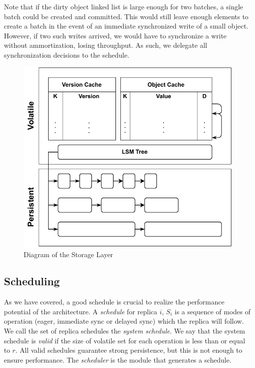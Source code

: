 Note that if the dirty object linked list is large enough
for two batches, a single batch could be created and committed.
This would still leave enough elements to create a batch in the
event of an immediate synchronized write of a small object. However, if
two such writes arrived, we would have to synchronize a write without
ammortization, losing throughput. As such, we delegate all
synchronization decisions to the schedule.


\begin{figure}[ht]
    \centering
    \includegraphics[width=.8\linewidth]{img/storage_layer}
    \caption{Diagram of the Storage Layer}\label{fig:storage_layer}
\end{figure}


\subsection{Scheduling}\label{ssec:schedule}


As we have covered, a good schedule is crucial to realize the
performance potential of the architecture. A \emph{schedule} for
replica $i$, $S_i$ is a sequence of modes of operation (eager,
immediate sync or delayed sync) which the replica will follow.
We call the set of replica schedules the \emph{system schedule}.
We say that the system schedule is \emph{valid} if the size of
volatile set for each operation is less than or equal to $r$. All valid
schedules guarantee strong persistence, but this is not enough to
ensure performance. The \emph{scheduler} is the module that
generates a schedule.

